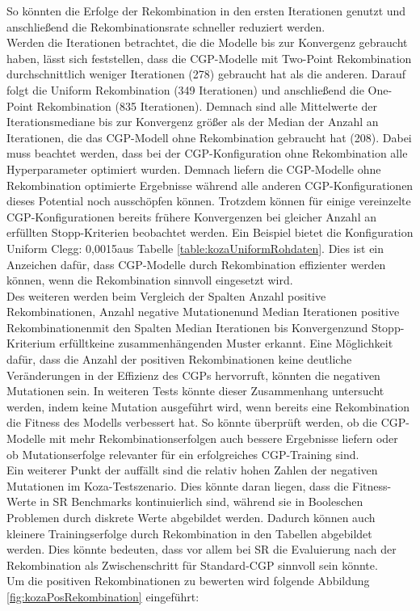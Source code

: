 So könnten die Erfolge der Rekombination in den ersten Iterationen genutzt und anschließend die Rekombinationsrate schneller reduziert werden.\\
Werden die Iterationen betrachtet, die die Modelle bis zur Konvergenz gebraucht haben, lässt sich feststellen, dass die CGP-Modelle mit Two-Point Rekombination durchschnittlich weniger Iterationen (278) gebraucht hat als die anderen.
Darauf folgt die Uniform Rekombination (349 Iterationen) und anschließend die One-Point Rekombination (835 Iterationen).
Demnach sind alle Mittelwerte der Iterationsmediane bis zur Konvergenz größer als der Median der Anzahl an Iterationen, die das CGP-Modell ohne Rekombination gebraucht hat (208).
Dabei muss beachtet werden, dass bei der CGP-Konfiguration ohne Rekombination alle Hyperparameter optimiert wurden.
Demnach liefern die CGP-Modelle ohne Rekombination optimierte Ergebnisse während alle anderen CGP-Konfigurationen dieses Potential noch ausschöpfen können.
Trotzdem können für einige vereinzelte CGP-Konfigurationen bereits frühere Konvergenzen bei gleicher Anzahl an erfüllten Stopp-Kriterien beobachtet werden.
Ein Beispiel bietet die Konfiguration \glqq Uniform Clegg: 0,0015\grqq\space aus Tabelle \ref{table:kozaUniformRohdaten}.
Dies ist ein Anzeichen dafür, dass CGP-Modelle durch Rekombination effizienter werden können, wenn die Rekombination sinnvoll eingesetzt wird.\\
Des weiteren werden beim Vergleich der Spalten \glqq Anzahl positive Rekombinationen\grqq, \glqq Anzahl negative Mutationen\grqq\space und \glqq Median Iterationen positive Rekombinationen\grqq\space mit den Spalten \glqq Median Iterationen bis Konvergenz\grqq\space und \glqq Stopp-Kriterium erfüllt\grqq\space keine zusammenhängenden Muster erkannt.
Eine Möglichkeit dafür, dass die Anzahl der positiven Rekombinationen keine deutliche Veränderungen in der Effizienz des CGPs hervorruft, könnten die negativen Mutationen sein.
In weiteren Tests könnte dieser Zusammenhang untersucht werden, indem keine Mutation ausgeführt wird, wenn bereits eine Rekombination die Fitness des Modells verbessert hat.
So könnte überprüft werden, ob die CGP-Modelle mit mehr Rekombinationserfolgen auch bessere Ergebnisse liefern oder ob Mutationserfolge relevanter für ein erfolgreiches CGP-Training sind.\\
Ein weiterer Punkt der auffällt sind die relativ hohen Zahlen der negativen Mutationen im Koza-Testszenario.
Dies könnte daran liegen, dass die Fitness-Werte in SR Benchmarks kontinuierlich sind, während sie in Booleschen Problemen durch diskrete Werte abgebildet werden.
Dadurch können auch kleinere Trainingserfolge durch Rekombination in den Tabellen abgebildet werden.
Dies könnte bedeuten, dass vor allem bei SR die Evaluierung nach der Rekombination als Zwischenschritt für Standard-CGP sinnvoll sein könnte.\\
Um die positiven Rekombinationen zu bewerten wird folgende Abbildung \ref{fig:kozaPosRekombination} eingeführt:


